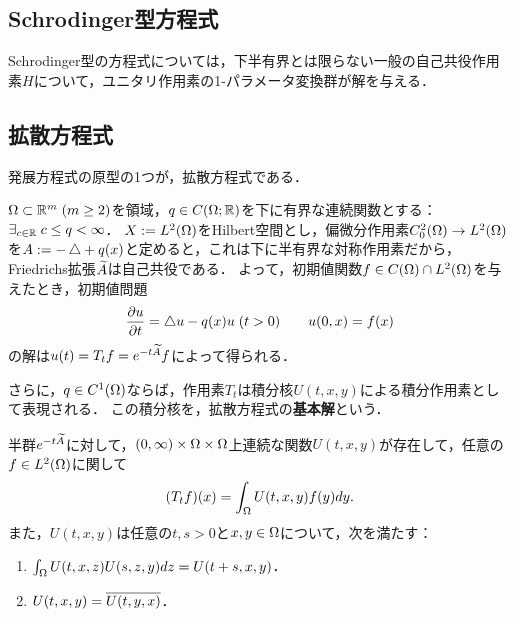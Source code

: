 \documentclass[uplatex,dvipdfmx]{jsreport}
\begin{document}
\subsection{Schrodinger型方程式}

\begin{tcolorbox}[colframe=ForestGreen, colback=ForestGreen!10!white,breakable,colbacktitle=ForestGreen!40!white,coltitle=black,fonttitle=\bfseries\sffamily,
title=]
    Schrodinger型の方程式については，下半有界とは限らない一般の自己共役作用素$H$について，ユニタリ作用素の1-パラメータ変換群が解を与える．
\end{tcolorbox}

\subsection{拡散方程式}

\begin{tcolorbox}[colframe=ForestGreen, colback=ForestGreen!10!white,breakable,colbacktitle=ForestGreen!40!white,coltitle=black,fonttitle=\bfseries\sffamily,
title=]
    発展方程式の原型の1つが，拡散方程式である．
\end{tcolorbox}

\begin{example}
    $\Omega\subset\mathbb{R}^m\;(m\ge2)$を領域，$q\in C(\Omega;\mathbb{R})$を下に有界な連続関数とする：$\exists_{c\in\mathbb{R}}\;c\le q<\infty$．
    $X:=L^2(\Omega)$をHilbert空間とし，偏微分作用素$C_0^2(\Omega)\to L^2(\Omega)$を$A:=-\mathop{}\!\mathbin\bigtriangleup+q(x)$と定めると，これは下に半有界な対称作用素だから，Friedrichs拡張$\widetilde{A}$は自己共役である．
    よって，初期値関数$f\in C(\Omega)\cap L^2(\Omega)$を与えたとき，初期値問題
    \[\frac{\partial u}{\partial t}=\mathop{}\!\mathbin\bigtriangleup u-q(x)u\;(t>0)\qquad u(0,x)=f(x)\]
    の解は$u(t)=T_tf=e^{-t\widetilde{A}}f$によって得られる．
\end{example}


\begin{definition}
    さらに，$q\in C^1(\Omega)$ならば，作用素$T_t$は積分核$U(t,x,y)$による積分作用素として表現される．
    この積分核を，拡散方程式の\textbf{基本解}という．
\end{definition}

\begin{theorem}
    半群$e^{-t\widetilde{A}}$に対して，$(0,\infty)\times\Omega\times\Omega$上連続な関数$U(t,x,y)$が存在して，任意の$f\in L^2(\Omega)$に関して
    \[(T_tf)(x)=\int_\Omega U(t,x,y)f(y)dy.\]
    また，$U(t,x,y)$は任意の$t,s>0$と$x,y\in\Omega$について，次を満たす：
    \begin{enumerate}
        \item $\int_\Omega U(t,x,z)U(s,z,y)dz=U(t+s,x,y)$．
        \item $U(t,x,y)=\overline{U(t,y,x)}$．
    \end{enumerate}
\end{theorem}
\end{document}
